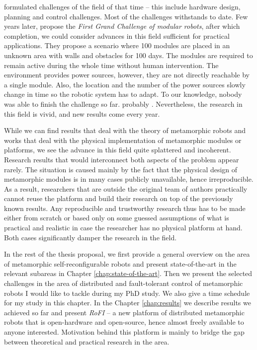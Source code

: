 \textcite{4141032} formulated challenges of the field of that time -- this
include hardware design, planning and control challenges. Most of the challenges
withstands to date. Few years later, \textcite{DBLP:journals/corr/abs-1108-5543}
propose the \emph{First Grand Challenge of modular robots}, after which
completion, we could consider advances in this field sufficient for practical
applications. They propose a scenario where 100 modules are placed in an unknown
area with walls and obstacles for 100 days. The modules are required to remain
active during the whole time without human intervention. The environment
provides power sources, however, they are not directly reachable by a single
module. Also, the location and the number of the power sources slowly change in
time so the robotic system has to adapt. To our knowledge, nobody was able to
finish the challenge so far.  probably \textcite{DBLP:conf/syscon/LeviMRKVSLC14}
\textcite{DBLP:conf/icra/TosunDJKCY18}. Nevertheless, the research in this field
is vivid, and new results come every year.

While we can find results that deal with the theory of metamorphic robots and
works that deal with the physical implementation of metamorphic modules or
platforms, we see the advance in this field quite splattered and incoherent.
Research results that would interconnect both aspects of the problem appear
rarely. The situation is caused mainly by the fact that the physical design of
metamorphic modules is in many cases publicly unavailable, hence irreproducible.
As a result, researchers that are outside the original team of authors
practically cannot reuse the platform and build their research on top of the
previously known results.  Any reproducible and trustworthy research thus has to
be made either from scratch or based only on some guessed assumptions of what is
practical and realistic in case the researcher has no physical platform at hand.
Both cases significantly damper the research in the field.

In the rest of the thesis proposal, we first provide a general overview on the
area of metamorphic self-reconfigurable robots and present state-of-the-art in
the relevant subareas in Chapter \ref{chap:state-of-the-art}. Then we present
the selected challenges in the area of distributed and fault-tolerant control of
metamorphic robots I would like to tackle during my PhD study. We also give a
time schedule for my study in this chapter. In the Chapter \ref{chap:results} we
describe results we achieved so far and present \emph{RoFI} -- a new platform of
distributed metamorphic robots that is open-hardware and open-source, hence
almost freely available to anyone interested. Motivation behind this platform is
mainly to bridge the gap between theoretical and practical research in the
area.
